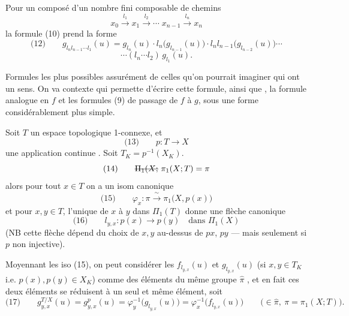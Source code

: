 \documentclass[11pt,a4paper]{article}
\begin{document}
Pour un composé d'un  nombre fini composable de chemins
\[
x_0 \xrightarrow{\ l_1\ } x_1 \xrightarrow{\ l_2\ } \cdots \; x_{n-1} \xrightarrow{\ l_n\ } x_n
\]
la formule (10) prend la forme
\[
\text{(12)}\qquad g_{l_n l_{n-1}\cdots l_1}(u) = g_{l_n}(u)\cdot l_n\bigl(g_{l_{n-1}}(u)\bigr)\cdot l_n l_{n-1}\bigl(g_{l_{n-2}}(u)\bigr)\cdots
\]
\[
\cdots (l_n\cdots l_2)\,g_{l_1}(u) .
\]

Formules les plus   possibles assurément de celles qu'on pourrait imaginer qui ont un sens. On va  \add{\ill{}} contexte qui permette  d'écrire cette formule, ainsi que , la formule analogue en $f$ et les formules
(9) de passage de $f$ à $g$, sous une forme considérablement plus simple.

Soit $T$ un espace topologique  1-connexe, et
\[
\text{(13)}\qquad p : T \longrightarrow X
\]
une application continue . Soit $T_K = p^{-1}(X_K)$.  
\[
\text{(14)}\qquad \text{\struck{$\Pi_1(X;$}}\ \pi_1(X;T) = \pi
\]
alors pour tout $x \in T$ on a un isom canonique
\[
\text{(15)}\qquad \varphi_x : \pi \xrightarrow{\ \sim\ } \pi_1\bigl(X,p(x)\bigr)
\]
 et pour $x, y \in T$, l'unique   de  $x$ à $y$ dans $\Pi_1(T)$ donne  une flèche canonique
\[
\text{(16)}\qquad l_{y,x} : p(x) \longrightarrow p(y) \quad\text{dans } \Pi_1(X)
\]
(NB cette flèche dépend du choix de $x, y$ au-dessus de $px$, $py$ — mais seulement si $p$ non injective).


Moyennant les iso (15), on peut considérer les $f_{l_{y,x}}(u)$ et $g_{l_{y,x}}(u)$  (si $x, y \in T_K$ i.e. $p(x), p(y) \in X_K$) comme des éléments du même groupe $\widehat{\pi}$ ,  et en fait ces deux éléments se réduisent à un seul et même élément, soit
\[
\text{(17)}\qquad g^{T/X}_{y,x}(u) = g^{p}_{y,x}(u) = \varphi_y^{-1}\bigl(g_{l_{y,x}}(u)\bigr) = \varphi_x^{-1}\bigl(f_{l_{y,x}}(u)\bigr) \qquad \bigl(\in \widehat{\pi},\ \pi = \pi_1(X;T)\bigr) .
\]
\end{document}
